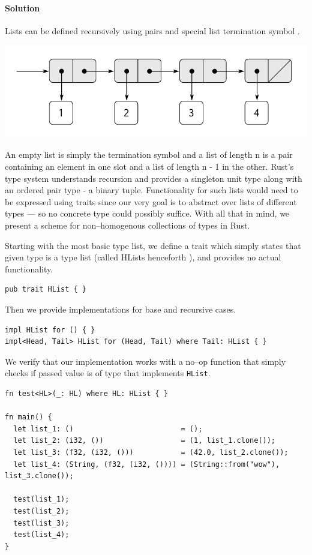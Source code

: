 \paragraph{Solution}

Lists can be defined recursively using pairs and special list termination symbol \cite{structureandinterpretation}.

\includegraphics[width=\textwidth]{figures/lisp-list.png}

An empty list is simply the termination symbol and a list of length n is a pair containing an element in one slot and a list of length n - 1 in the other.
Rust's type system understands recursion and provides a singleton unit type along with an ordered pair type - a binary tuple.
Functionality for such lists would need to be expressed using traits since our very goal is to abstract over lists of different types --- so no concrete type could possibly suffice.
With all that in mind, we present a scheme for non--homogenous collections of types in Rust.

Starting with the most basic type list, we define a trait which simply states that given type is a type list (called HLists henceforth \cite{frunk}), and provides no actual functionality.

\begin{lstlisting}
pub trait HList { }
\end{lstlisting}

Then we provide implementations for base and recursive cases.

\begin{lstlisting}
impl HList for () { }
impl<Head, Tail> HList for (Head, Tail) where Tail: HList { }
\end{lstlisting}

We verify that our implementation works with a no--op function that simply checks if passed value is of type that implements \texttt{HList}.

\begin{lstlisting}[basicstyle=\tiny]
fn test<HL>(_: HL) where HL: HList { }

fn main() {
  let list_1: ()                         = ();
  let list_2: (i32, ())                  = (1, list_1.clone());
  let list_3: (f32, (i32, ()))           = (42.0, list_2.clone());
  let list_4: (String, (f32, (i32, ()))) = (String::from("wow"), list_3.clone());

  test(list_1);
  test(list_2);
  test(list_3);
  test(list_4);
}
\end{lstlisting}

